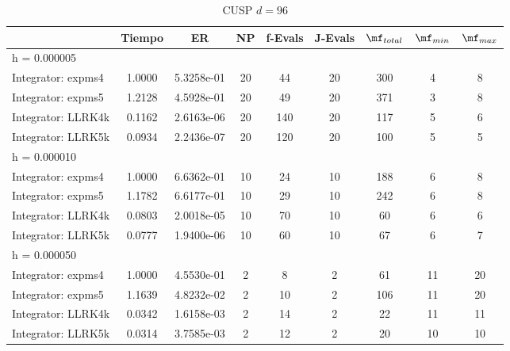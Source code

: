 \begin{table}[htb]
	\centering
\begin{tabular}{l|c|c|c|c|c|c|c|c}
\hline
& Tiempo & ER & NP & f-Evals & J-Evals & $\mf_{total}$ & $\mf_{min}$ & $\mf_{max}$ \\
\hline h = 0.000005 &  &  &  &  &  &  &  &  \\
 Integrator: expms4 & 1.0000 & 5.3258e-01 & 20 & 44 & 20 & 300 & 4 & 8  \\
Integrator: expms5 & 1.2128 & 4.5928e-01 & 20 & 49 & 20 & 371 & 3 & 8  \\
Integrator: LLRK4k & 0.1162 & 2.6163e-06 & 20 & 140 & 20 & 117 & 5 & 6  \\
Integrator: LLRK5k & 0.0934 & 2.2436e-07 & 20 & 120 & 20 & 100 & 5 & 5  \\
\hline
\hline h = 0.000010 &  &  &  &  &  &  &  &  \\
 Integrator: expms4 & 1.0000 & 6.6362e-01 & 10 & 24 & 10 & 188 & 6 & 8  \\
Integrator: expms5 & 1.1782 & 6.6177e-01 & 10 & 29 & 10 & 242 & 6 & 8  \\
Integrator: LLRK4k & 0.0803 & 2.0018e-05 & 10 & 70 & 10 & 60 & 6 & 6  \\
Integrator: LLRK5k & 0.0777 & 1.9400e-06 & 10 & 60 & 10 & 67 & 6 & 7  \\
\hline
\hline h = 0.000050 &  &  &  &  &  &  &  &  \\
 Integrator: expms4 & 1.0000 & 4.5530e-01 & 2 & 8 & 2 & 61 & 11 & 20  \\
Integrator: expms5 & 1.1639 & 4.8232e-02 & 2 & 10 & 2 & 106 & 11 & 20  \\
Integrator: LLRK4k & 0.0342 & 1.6158e-03 & 2 & 14 & 2 & 22 & 11 & 11  \\
Integrator: LLRK5k & 0.0314 & 3.7585e-03 & 2 & 12 & 2 & 20 & 10 & 10  \\
\hline
\end{tabular}
\caption{CUSP $d=96$}
\end{table}
